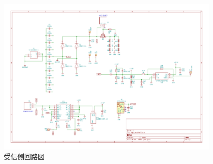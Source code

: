 \begin{landscape}
\begin{figure}[p]
\begin{center}

\includegraphics[width=220mm]{figures/wpf_receiver7_circuit.pdf}
  \caption{受信側回路図}

  \end{center}
\end{figure}
\end{landscape}


